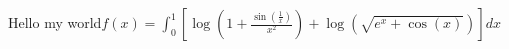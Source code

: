 \documentclass[preview]{standalone}
\begin{document}
\begin{center}
Hello my world\(f(x) = \int_{0}^{1} \left[ \log\left( 1 + \frac{\sin\left( \frac{1}{x} \right)}{x^2} \right) + \log\left( \sqrt{e^x + \cos(x)} \right) \right] dx\)
\end{center}
\end{document}

